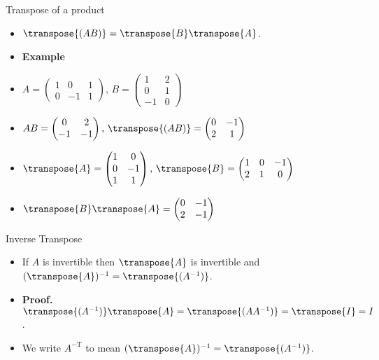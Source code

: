 \documentclass{beamer}
\begin{document}
\begin{frame}{Transpose of a product}
\begin{itemize}
\item $\transpose{(AB)} =  \transpose{B}\transpose{A}$.
\item \textbf{Example}
\item $A=
\begin{pmatrix}
1 & 0 & 1 \\
0 & -1 & 1
\end{pmatrix}
\text{, }
B=
\begin{pmatrix}
1 & 2 \\
0 & 1 \\
-1 & 0
\end{pmatrix}
$
\item $AB=
\begin{pmatrix}
0 & 2 \\
-1 & -1
\end{pmatrix}
\text{, }
\transpose{(AB)}=
\begin{pmatrix}
0 & -1 \\
2 & 1
\end{pmatrix}
$
\item $\transpose{A}=
\begin{pmatrix}
1 & 0 \\
0 & -1 \\
1 & 1
\end{pmatrix}
\text{, }
\transpose{B}=
\begin{pmatrix}
1 & 0 & -1 \\
2 & 1 & 0
\end{pmatrix}
$
\item $\transpose{B}\transpose{A}=
\begin{pmatrix}
0 & -1 \\
2 & -1
\end{pmatrix}
$
\end{itemize}
\end{frame}


\begin{frame}{Inverse Transpose}
\begin{itemize}
\item If $A$ is invertible then $\transpose{A}$ is invertible and
$(\transpose{A})^{-1}=\transpose{(A^{-1})}$.
\item \textbf{Proof.} $\transpose{(A^{-1})}\transpose{A}=\transpose{(A A^{-1})} = \transpose{I} = I$.
\item We write $A^{-\text{T}}$ to mean $(\transpose{A})^{-1}=\transpose{(A^{-1})}$.
\end{itemize}
\end{frame}
\end{document}
